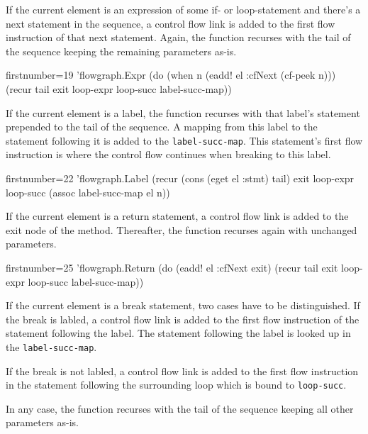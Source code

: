 \documentclass[11pt]{article}
\begin{document}
If the current element is an expression of some if- or loop-statement and
there's a next statement in the sequence, a control flow link is added to the
first flow instruction of that next statement.  Again, the function recurses
with the tail of the sequence keeping the remaining parameters as-is.

\begin{clojurecode*}{firstnumber=19}
        'flowgraph.Expr
                   (do (when n (eadd! el :cfNext (cf-peek n)))
                       (recur tail exit loop-expr loop-succ label-succ-map))
\end{clojurecode*}

If the current element is a label, the function recurses with that label's
statement prepended to the tail of the sequence.  A mapping from this label to
the statement following it is added to the \verb|label-succ-map|.  This
statement's first flow instruction is where the control flow continues when
breaking to this label.

\begin{clojurecode*}{firstnumber=22}
        'flowgraph.Label
                   (recur (cons (eget el :stmt) tail) exit loop-expr loop-succ
                          (assoc label-succ-map el n))
\end{clojurecode*}

If the current element is a return statement, a control flow link is added to
the exit node of the method.  Thereafter, the function recurses again with
unchanged parameters.

\begin{clojurecode*}{firstnumber=25}
        'flowgraph.Return
                   (do (eadd! el :cfNext exit)
                       (recur tail exit loop-expr loop-succ label-succ-map))
\end{clojurecode*}

If the current element is a break statement, two cases have to be
distinguished.  If the break is labled, a control flow link is added to the
first flow instruction of the statement following the label.  The statement
following the label is looked up in the \verb|label-succ-map|.

If the break is not labled, a control flow link is added to the first flow
instruction in the statement following the surrounding loop which is bound to
\verb|loop-succ|.

In any case, the function recurses with the tail of the sequence keeping all
other parameters as-is.
\end{document}

